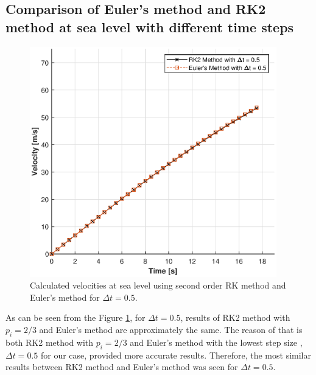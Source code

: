 \documentclass[letterpaper,12pt]{article}
\begin{document}
\subsection{Comparison of Euler's method and RK2 method at sea level with different time steps}
\begin{figure}[ht]
        \centering \includegraphics[max height=10cm]{graphs/compare05.eps}
        \caption{Calculated velocities at sea level using second order RK method and Euler's method for $\Delta t=0.5$.}
        \label{fig:rk2_05}
\end{figure}
As can be seen from the Figure \ref{fig:rk2_05}, for $\Delta t = 0.5$, results of RK2 method with $p_i=2/3$ and Euler's method
are approximately the same. The reason of that is both RK2 method with $p_i=2/3$ and Euler's method with the lowest step
size ,$\Delta t = 0.5$ for our case, provided more accurate results. Therefore, the most similar results between RK2
method and Euler's method was seen for $\Delta t =0.5$.
\newpage
\end{document}
